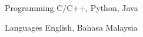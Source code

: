 

\begin{cvskills}

  \cvskill
    {Programming} %
    {C/C++, Python, Java} %

  \cvskill
    {Languages} %
    {English, Bahasa Malaysia} %

\end{cvskills}

